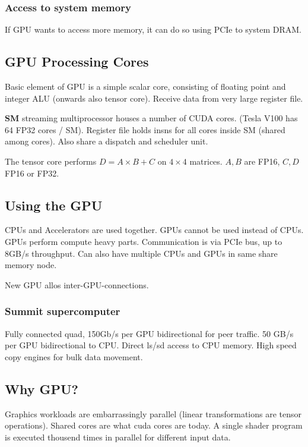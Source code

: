 \documentclass[a4paper, fontsize=8pt, landscape, DIV=1]{scrartcl}
\begin{document}
\begin{multicols*}{4}
  \subsubsection{Access to system memory}
  If GPU wants to access more memory, it can do so using PCIe to system DRAM.
  
  \subsection{GPU Processing Cores}
  Basic element of GPU is a simple scalar core, consisting of floating point and
  integer ALU (onwards also tensor core). Receive data from very large register
  file.

  \textbf{SM} streaming multiprocessor houses a number of CUDA cores. (Tesla V100
  has 64 FP32 cores / SM). Register file holds insns for all cores inside SM (shared
  among cores). Also share a dispatch and scheduler unit. 


  The tensor core performs $D=A\times B +C$ on $4\times 4$ matrices. $A,B$ are FP16,
  $C,D$ FP16 or FP32.

  \subsection{Using the GPU}
  CPUs and Accelerators are used together. GPUs cannot be used instead of CPUs. 
  GPUs perform compute heavy parts. Communication is via PCIe bus, up to 8GB/s
  throughput. 
  Can also have multiple CPUs and GPUs in same share memory node.

  New GPU allos inter-GPU-connections.
  
  \subsubsection{Summit supercomputer}
  Fully connected quad, 150Gb/s per GPU bidirectional for peer traffic. 50 GB/s
  per GPU bidirectional to CPU. Direct ls/sd access to CPU memory. High speed copy
  engines for bulk data movement.

  \subsection{Why GPU?}
  Graphics workloads are embarrassingly parallel (linear transformations are tensor
  operations). Shared cores are what cuda cores are today.
  A single shader program is executed thousend times in parallel for different input 
  data.


\end{multicols*}
\end{document}
